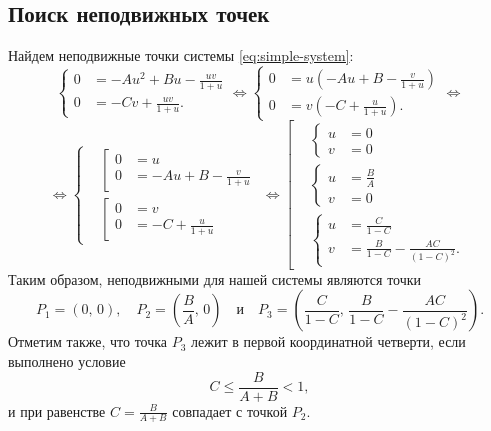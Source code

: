\documentclass[a4paper, 11pt]{article}
\begin{document}
	\subsection{Поиск неподвижных точек}
	Найдем неподвижные точки системы \eqref{eq:simple-system}:
	$$
		\left\{\begin{aligned}
		0 &= -A u^2 + Bu - \frac{uv}{1 + u}\\
		0 &= -C v + \frac{uv}{1 + u}.
		\end{aligned}\right.
		\Longleftrightarrow
		\left\{\begin{aligned}
		0 &= u\left(-A u + B - \frac{v}{1 + u}\right)\\
		0 &= v\left(-C + \frac{u}{1 + u}\right).
		\end{aligned}\right.
		\Longleftrightarrow
	$$
	$$
		\Longleftrightarrow
		\left\{\begin{aligned}
		&\left[\begin{aligned}
			0 &= u \\
			0 &= -Au + B -\frac{v}{1 + u}
		\end{aligned}\right.
		\\
		&\left[\begin{aligned}
			0 &= v \\
			0 &= -C + \frac{u}{1 + u}
		\end{aligned}\right.
		\end{aligned}\right.
		\Longleftrightarrow
		\left[\begin{aligned}
		&\left\{\begin{aligned}
			u &= 0 \\
			v &=0
		\end{aligned}\right.
		\\
		&\left\{\begin{aligned}
			u &= \frac{B}{A} \\
			v &= 0
		\end{aligned}\right.
		\\
		&\left\{\begin{aligned}
			u &= \frac{C}{1 - C} \\
			v &= \frac{B}{1-C} - \frac{AC}{(1 - C)^2}.
		\end{aligned}\right.
		\end{aligned}\right.
	$$
	Таким образом, неподвижными для нашей системы являются точки
	$$
		P_1 = (0,\,0),
		\quad
		P_2 = \left(\frac{B}{A},\,0\right)
		\quad \mbox{и} \quad 
		P_3 = \left(\frac{C}{1 - C},\, \frac{B}{1 - C} - \frac{AC}{(1 - C)^2}\right).
	$$
	Отметим также, что точка $P_3$ лежит в первой координатной четверти, если выполнено условие
	\begin{equation}
		C \leqslant \frac{B}{A + B} < 1,
	\end{equation}
		и при равенстве $C = \frac{B}{A+B}$ совпадает с точкой $P_2$.
\end{document}
